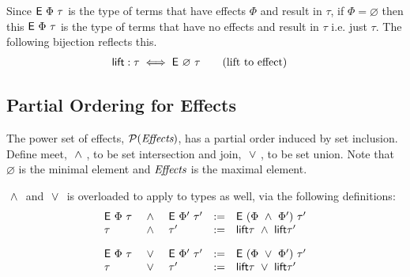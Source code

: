 \documentclass{article}
\begin{document}
Since $\textsf{E} ~ \Phi ~ \tau$ is the type of terms that have effects $\Phi$ and result in $\tau$,
if $\Phi = \varnothing$ then this $\textsf{E} ~ \Phi ~ \tau$ is the type of terms that have
no effects and result in $\tau$ i.e. just $\tau$. The following bijection reflects this.
\begin{align*}
 \textsf{lift} : \tau & \iff \textsf{E} ~ \varnothing ~ \tau \tag{lift to effect}
\end{align*}


\subsection{Partial Ordering for Effects}

The power set of effects, $\mathcal{P}(\textit{Effects})$,
has a partial order induced by set inclusion.
Define meet, $~ \land ~$, to be set intersection
and join, $~ \lor ~$, to be set union.
Note that $\varnothing$ is the minimal element and $\textit{Effects}$ is the maximal element.

$~ \land ~$ and $~ \lor ~$ is overloaded to apply to types as well,
via the following definitions:
\[ \begin{array}{lclcl}
  \textsf{E} ~ \Phi ~ \tau & ~ \land ~ & \textsf{E} ~ \Phi' ~ \tau'
                      & :=    & \textsf{E} ~ (\Phi ~ \land ~ \Phi') ~ \tau'
  \\
  \tau                & ~ \land ~ & \tau'
                      & :=    & \textsf{lift} \tau ~ \land ~ \textsf{lift} \tau'
  \\[1em]
  \textsf{E} ~ \Phi ~ \tau & ~ \lor ~ & \textsf{E} ~ \Phi' ~ \tau'
                      & :=    & \textsf{E} ~ (\Phi ~ \lor ~ \Phi') ~ \tau'
  \\
  \tau                & ~ \lor ~ & \tau'
                      & :=    & \textsf{lift} \tau ~ \lor ~ \textsf{lift} \tau'
 \end{array} \]

\newpage
\end{document}
